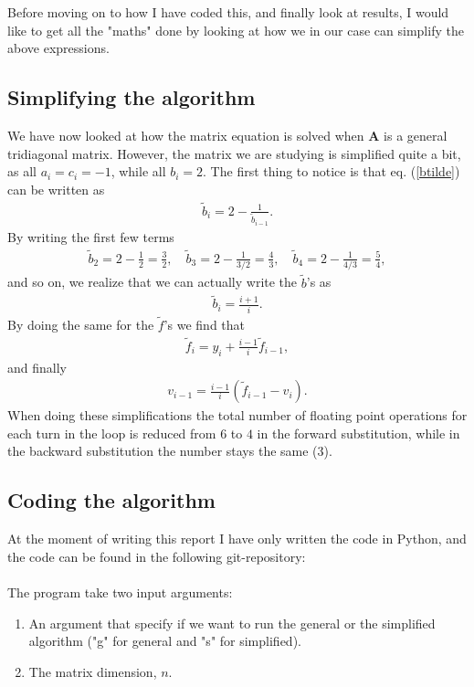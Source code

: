 \documentclass[12pt, a4paper]{article}
\begin{document}
Before moving on to how I have coded this, and finally look at results, I would like to get all the 
"maths" done by looking at how we in our case can simplify the above expressions.    

\subsection{Simplifying the algorithm}

We have now looked at how the matrix equation is solved when $\mathbf{A}$ is a general tridiagonal matrix. 
However, the matrix we are studying is simplified quite a bit, as all $a_i = c_i = -1$, while 
all $b_i = 2$. The first thing to notice is that eq. (\ref{btilde}) can be written as 
\begin{align*}
\tilde{b}_i = 2- \frac{1}{\tilde{b}_{i-1}}. 
\end{align*}
By writing the first few terms 
\begin{align*}
\tilde{b}_2 = 2 - \frac{1}{2} = \frac{3}{2}, \quad \tilde{b}_3 = 2- \frac{1}{3/2} = \frac{4}{3}, \quad 
\tilde{b}_4 = 2 - \frac{1}{4/3} = \frac{5}{4}, 
\end{align*}
and so on, we realize that we can actually write the $\tilde{b}$'s as 
\begin{align*}
\tilde{b}_i = \frac{i+1}{i}. 
\end{align*}
By doing the same for the $\tilde{f}$'s we find that 
\begin{align*}
\tilde{f}_i = y_i + \frac{i-1}{i}\tilde{f}_{i-1}, 
\end{align*}
and finally 
\begin{align*}
v_{i-1} = \frac{i-1}{i}(\tilde{f}_{i-1} - v_i). 
\end{align*}
When doing these simplifications the total number of floating point operations for each turn in the loop 
is reduced from $6$ to $4$ in the forward substitution, while in the backward substitution the number 
stays the same ($3$). 

\subsection{Coding the algorithm}

At the moment of writing this report I have only written the code in Python, and the code can be found in 
the following git-repository: \vspace{0.5cm} \\ 
 \vspace{0.5cm} \\ 
The program take two input arguments: 
\begin{enumerate}
\item An argument that specify if we want to run the general or the simplified algorithm ("g" for 
general and "s" for simplified). 
\item The matrix dimension, $n$. 
\end{enumerate}  
\end{document}
